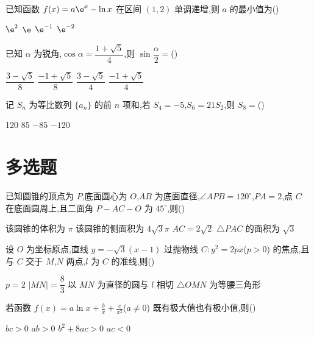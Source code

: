\begin{problem}
已知函数 \(f(x)=a\e^x-\ln x\) 在区间 \((1,2)\) 单调递增,则 \(a\) 的最小值为(\quad)

\choices
    {\(\e^2\)}
    {\(\e\)}
    {\(\e^{-1}\)}
    {\(\e^{-2}\)}
\end{problem}

\begin{problem}
已知 \(\alpha\) 为锐角,\(\cos\alpha=\dfrac{1+\sqrt5}{4}\),则 \(\sin\dfrac{\alpha}{2}=\)(\quad)

\choices
    {\(\dfrac{3-\sqrt5}{8}\)}
    {\(\dfrac{-1+\sqrt5}{8}\)}
    {\(\dfrac{3-\sqrt5}{4}\)}
    {\(\dfrac{-1+\sqrt5}{4}\)}
\end{problem}

\begin{problem}
记 \(S_n\) 为等比数列 \(\{a_n\}\) 的前 \(n\) 项和,若 \(S_4=-5\),\(S_6=21S_2\),则 \(S_8=\)(\quad)

\choices
    {120}
    {85}
    {\(-85\)}
    {\(-120\)}
\end{problem}

\section{多选题}

\begin{problem}
已知圆锥的顶点为 \(P\),底面圆心为 \(O\),\(AB\) 为底面直径,\(\angle APB=120^\circ\),\(PA=2\),点 \(C\) 在底面圆周上,且二面角 \(P-AC-O\) 为 \(45^\circ\),则(\quad)

\choices
    {该圆锥的体积为 \(\pi\)}
    {该圆锥的侧面积为 \(4\sqrt3\pi\)}
    {\(AC=2\sqrt2\)}
    {\(\triangle PAC\) 的面积为 \(\sqrt3\)}
\end{problem}

\begin{problem}
设 \(O\) 为坐标原点,直线 \(y=-\sqrt3(x-1)\) 过抛物线 \(C:y^2=2px\)(\(p>0\)) 的焦点,且与 \(C\) 交于 \(M\),\(N\) 两点,\(l\) 为 \(C\) 的准线,则(\quad)

\choices
    {\(p=2\)}
    {\(|MN|=\dfrac83\)}
    {以 \(MN\) 为直径的圆与 \(l\) 相切}
    {\(\triangle OMN\) 为等腰三角形}
\end{problem}

\begin{problem}
若函数 \(f(x)=a\ln x+\frac{b}{x}+\frac{c}{x^2}\)(\(a\ne 0\)) 既有极大值也有极小值,则(\quad)

\choices
    {\(bc>0\)}
    {\(ab>0\)}
    {\(b^2+8ac>0\)}
    {\(ac<0\)}
\end{problem}

